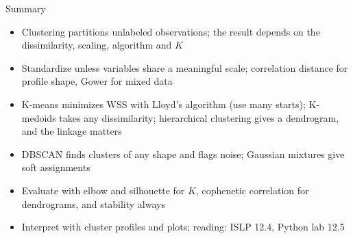 \begin{frame}{Summary}
    \begin{itemize}
        \item Clustering partitions unlabeled observations; the result depends on the dissimilarity, scaling, algorithm and $K$
        \item Standardize unless variables share a meaningful scale; correlation distance for profile shape, Gower for mixed data
        \item K-means minimizes WSS with Lloyd's algorithm (use many starts); K-medoids takes any dissimilarity; hierarchical clustering gives a dendrogram, and the linkage matters
        \item DBSCAN finds clusters of any shape and flags noise; Gaussian mixtures give soft assignments
        \item Evaluate with elbow and silhouette for $K$, cophenetic correlation for dendrograms, and stability always
        \item Interpret with cluster profiles and plots; reading: ISLP 12.4, Python lab 12.5
    \end{itemize}
\end{frame}
